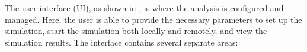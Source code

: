 The user interface (UI), as shown in , is where the analysis
is configured and managed. Here, the user is able to provide the necessary
parameters to set up the simulation, start the simulation both locally and
remotely, and view the simulation results. The interface contains several
separate areas:


